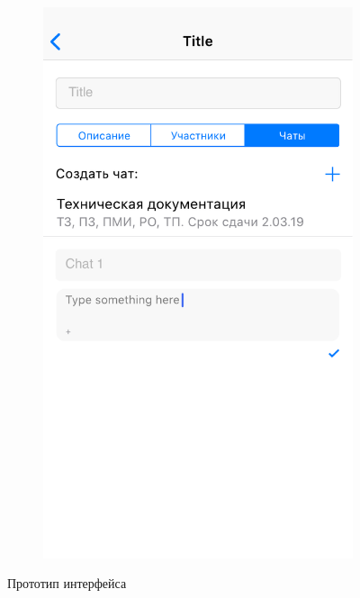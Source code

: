 \documentclass[a4paper,12pt]{article}
\begin{document}
\begin{figure}[h!]
\begin{subfigure}[b]{0.3\linewidth}
			\includegraphics[width=\linewidth]{../includes/prototype/8.pdf}
		\end{subfigure}
		\caption{Прототип интерфейса}
	\end{figure}
\end{document}
